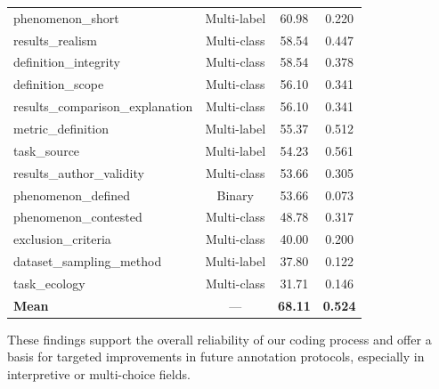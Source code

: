 \begin{table}[h!]
\begin{tabular}{lccc}
phenomenon\_short             & Multi-label     & 60.98 & 0.220 \\
results\_realism              & Multi-class     & 58.54 & 0.447 \\
definition\_integrity         & Multi-class     & 58.54 & 0.378 \\
definition\_scope             & Multi-class     & 56.10 & 0.341 \\
results\_comparison\_explanation & Multi-class & 56.10 & 0.341 \\
metric\_definition            & Multi-label     & 55.37 & 0.512 \\
task\_source                  & Multi-label     & 54.23 & 0.561 \\
results\_author\_validity     & Multi-class     & 53.66 & 0.305 \\
phenomenon\_defined           & Binary          & 53.66 & 0.073 \\
phenomenon\_contested         & Multi-class     & 48.78 & 0.317 \\
exclusion\_criteria           & Multi-class     & 40.00 & 0.200 \\
dataset\_sampling\_method     & Multi-label     & 37.80 & 0.122 \\
task\_ecology                 & Multi-class     & 31.71 & 0.146 \\
\midrule
\textbf{Mean}                 & —               & \textbf{68.11} & \textbf{0.524} \\
\bottomrule
\end{tabular}
\end{table}

These findings support the overall reliability of our coding process and offer a basis for targeted improvements in future annotation protocols, especially in interpretive or multi-choice fields.


